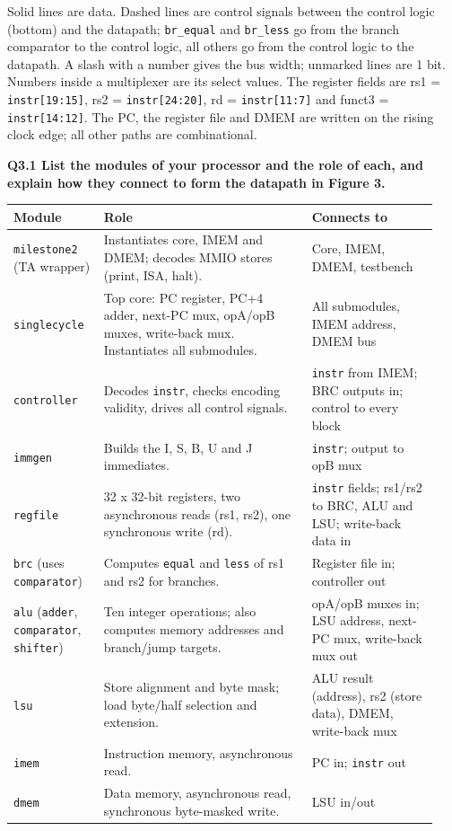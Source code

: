 \documentclass[10pt,a4paper]{article}
\newcommand{\code}[1]{\texttt{#1}}
\begin{document}
{\small Solid lines are data. Dashed lines are control signals between the
control logic (bottom) and the datapath; \code{br\_equal} and \code{br\_less}
go from the branch comparator to the control logic, all others go from the
control logic to the datapath. A slash with a number gives the bus width; unmarked lines are
1 bit. Numbers inside a multiplexer are its select values. The register
fields are rs1 = \code{instr[19:15]}, rs2 = \code{instr[24:20]},
rd = \code{instr[11:7]} and funct3 = \code{instr[14:12]}. The PC, the register
file and DMEM are written on the rising clock edge; all other paths are
combinational.\par}

\textbf{Q3.1 List the modules of your processor and the role of each,
and explain how they connect to form the datapath in Figure 3.}

\begin{tabular}{@{}p{0.2\linewidth}p{0.46\linewidth}p{0.28\linewidth}@{}}
\toprule
\textbf{Module} & \textbf{Role} & \textbf{Connects to} \\
\midrule
\code{milestone2} (TA wrapper) & Instantiates core, IMEM and DMEM; decodes MMIO stores (print, ISA, halt). & Core, IMEM, DMEM, testbench \\
\code{singlecycle} & Top core: PC register, PC+4 adder, next-PC mux, opA/opB muxes, write-back mux. Instantiates all submodules. & All submodules, IMEM address, DMEM bus \\
\code{controller} & Decodes \code{instr}, checks encoding validity, drives all control signals. & \code{instr} from IMEM; BRC outputs in; control to every block \\
\code{immgen} & Builds the I, S, B, U and J immediates. & \code{instr}; output to opB mux \\
\code{regfile} & 32 x 32-bit registers, two asynchronous reads (rs1, rs2), one synchronous write (rd). & \code{instr} fields; rs1/rs2 to BRC, ALU and LSU; write-back data in \\
\code{brc} (uses \code{comparator}) & Computes \code{equal} and \code{less} of rs1 and rs2 for branches. & Register file in; controller out \\
\code{alu} (\code{adder}, \code{comparator}, \code{shifter}) & Ten integer operations; also computes memory addresses and branch/jump targets. & opA/opB muxes in; LSU address, next-PC mux, write-back mux out \\
\code{lsu} & Store alignment and byte mask; load byte/half selection and extension. & ALU result (address), rs2 (store data), DMEM, write-back mux \\
\code{imem} & Instruction memory, asynchronous read. & PC in; \code{instr} out \\
\code{dmem} & Data memory, asynchronous read, synchronous byte-masked write. & LSU in/out \\
\bottomrule
\end{tabular}
\end{document}
